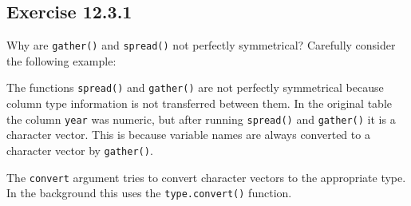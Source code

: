 \documentclass[]{book}
\newenvironment{Shaded}{\begin{snugshade}}{\end{snugshade}}
\newcommand{\CommentTok}[1]{\textcolor[rgb]{0.56,0.35,0.01}{\textit{#1}}}
\newcommand{\DataTypeTok}[1]{\textcolor[rgb]{0.13,0.29,0.53}{#1}}
\newcommand{\DecValTok}[1]{\textcolor[rgb]{0.00,0.00,0.81}{#1}}
\newcommand{\FloatTok}[1]{\textcolor[rgb]{0.00,0.00,0.81}{#1}}
\newcommand{\KeywordTok}[1]{\textcolor[rgb]{0.13,0.29,0.53}{\textbf{#1}}}
\newcommand{\NormalTok}[1]{#1}
\newcommand{\OperatorTok}[1]{\textcolor[rgb]{0.81,0.36,0.00}{\textbf{#1}}}
\newcommand{\StringTok}[1]{\textcolor[rgb]{0.31,0.60,0.02}{#1}}
\theoremstyle{plain}
\theoremstyle{remark}
\theoremstyle{definition}
\theoremstyle{definition}
\theoremstyle{definition}
\theoremstyle{remark}
\begin{document}
\hypertarget{exercise-12.3.1}{%
\subsection*{\texorpdfstring{Exercise
{12.3.1}}{Exercise 12.3.1}}\label{exercise-12.3.1}}

Why are \texttt{gather()} and \texttt{spread()} not perfectly
symmetrical? Carefully consider the following example:

\begin{Shaded}
\end{Shaded}

The functions \texttt{spread()} and \texttt{gather()} are not perfectly
symmetrical because column type information is not transferred between
them. In the original table the column \texttt{year} was numeric, but
after running \texttt{spread()} and \texttt{gather()} it is a character
vector. This is because variable names are always converted to a
character vector by \texttt{gather()}.

The \texttt{convert} argument tries to convert character vectors to the
appropriate type. In the background this uses the
\texttt{type.convert()} function.
\end{document}
